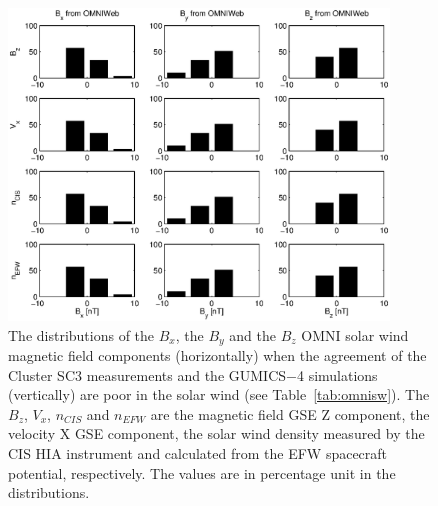 \documentclass[linenumbers,draft]{agujournal}
\begin{document}
\pagebreak

\begin{figure}[h]
\centering
\includegraphics[width=0.9\textwidth,angle=0]{swe-2020-corr-f14.eps}  
\caption{The distributions of the $B_{x}$, the $B_{y}$ and the $B_{z}$ OMNI solar wind magnetic field components (horizontally) when the agreement of the Cluster SC3 measurements and the GUMICS$-$4 simulations (vertically) are poor in the solar wind (see Table~\ref{tab:omnisw}). The $B_{z}$, $V_{x}$, $n_{CIS}$ and $n_{EFW}$ are the magnetic field GSE Z component, the velocity X GSE component, the solar wind density measured by the CIS HIA instrument and calculated from the EFW spacecraft potential, respectively. The values are in percentage unit in the distributions.}
\label{fig:swomnibxyz}
\end{figure}

\pagebreak
\end{document}
